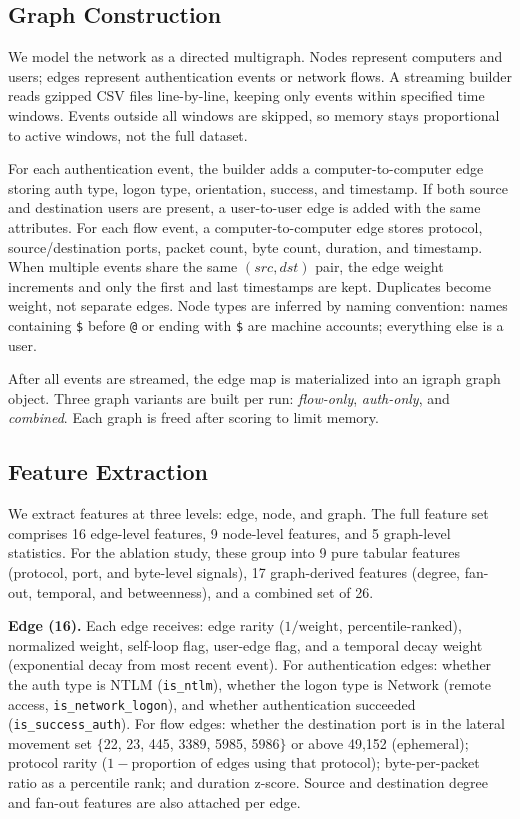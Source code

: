 \documentclass[letterpaper,twocolumn,10pt]{article}
\begin{document}
\subsection{Graph Construction}

We model the network as a directed multigraph. Nodes represent computers and users; edges represent authentication events or network flows. A streaming builder reads gzipped CSV files line-by-line, keeping only events within specified time windows. Events outside all windows are skipped, so memory stays proportional to active windows, not the full dataset.

For each authentication event, the builder adds a computer-to-computer edge storing auth type, logon type, orientation, success, and timestamp. If both source and destination users are present, a user-to-user edge is added with the same attributes. For each flow event, a computer-to-computer edge stores protocol, source/destination ports, packet count, byte count, duration, and timestamp. When multiple events share the same $(src, dst)$ pair, the edge weight increments and only the first and last timestamps are kept. Duplicates become weight, not separate edges. Node types are inferred by naming convention: names containing \texttt{\$} before \texttt{@} or ending with \texttt{\$} are machine accounts; everything else is a user.

After all events are streamed, the edge map is materialized into an igraph graph object. Three graph variants are built per run: \emph{flow-only}, \emph{auth-only}, and \emph{combined}. Each graph is freed after scoring to limit memory.

\subsection{Feature Extraction}

We extract features at three levels: edge, node, and graph. The full feature set comprises 16 edge-level features, 9 node-level features, and 5 graph-level statistics. For the ablation study, these group into 9 pure tabular features (protocol, port, and byte-level signals), 17 graph-derived features (degree, fan-out, temporal, and betweenness), and a combined set of 26.

\textbf{Edge (16).}
Each edge receives: edge rarity ($1 / \text{weight}$, percentile-ranked), normalized weight, self-loop flag, user-edge flag, and a temporal decay weight (exponential decay from most recent event). For authentication edges: whether the auth type is NTLM (\texttt{is\_ntlm}), whether the logon type is Network (remote access, \texttt{is\_network\_logon}), and whether authentication succeeded (\texttt{is\_success\_auth}). For flow edges: whether the destination port is in the lateral movement set $\{$22, 23, 445, 3389, 5985, 5986$\}$ or above 49,152 (ephemeral); protocol rarity ($1 - \text{proportion of edges using that protocol}$); byte-per-packet ratio as a percentile rank; and duration z-score. Source and destination degree and fan-out features are also attached per edge.
\end{document}
